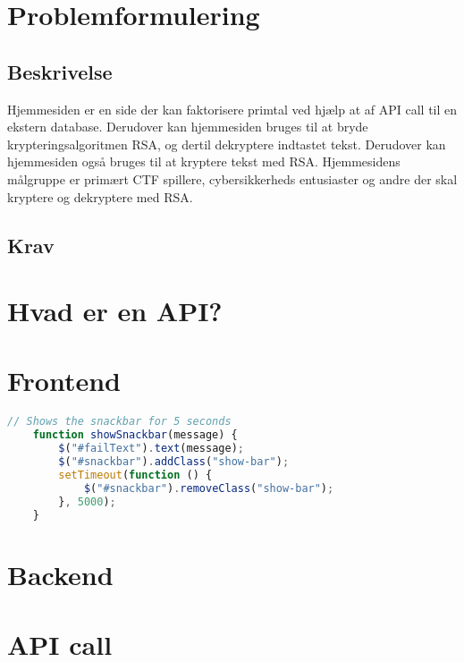 \documentclass{article}
\begin{document}
    \section{Problemformulering}\label{sec:problemformulering}

    \subsection{Beskrivelse}\label{subsec:beskrivelse}
    Hjemmesiden er en side der kan faktorisere primtal ved hjælp at af API call til en ekstern database.
    Derudover kan hjemmesiden bruges til at bryde krypteringsalgoritmen RSA, og dertil dekryptere indtastet tekst.
    Derudover kan hjemmesiden også bruges til at kryptere tekst med RSA. Hjemmesidens målgruppe er primært CTF
    spillere, cybersikkerheds entusiaster og andre der skal kryptere og dekryptere med RSA.

    \subsection{Krav}\label{subsec:krav}


    \section{Hvad er en API?}\label{sec:hvad-er-en-api?}


    \section{Frontend}\label{sec:frontend}
    \begin{lstlisting}[language=JavaScript,label={lst:kode}]
    // Shows the snackbar for 5 seconds
    function showSnackbar(message) {
        $("#failText").text(message);
        $("#snackbar").addClass("show-bar");
        setTimeout(function () {
            $("#snackbar").removeClass("show-bar");
        }, 5000);
    }
    \end{lstlisting}


    \section{Backend}\label{sec:backend}


    \section{API call}\label{sec:api-call}

    
    
\end{document}
